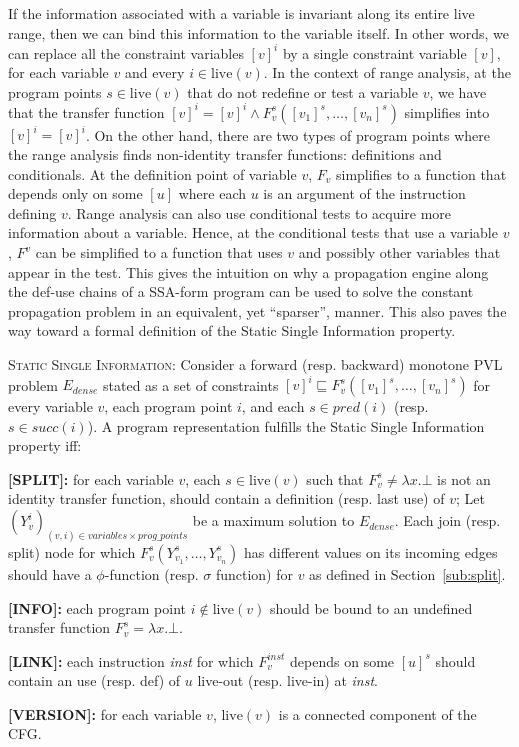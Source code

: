 If the information associated with a variable is invariant along its
entire live range, then we can bind this information to the variable itself.
In other words, we can replace all the constraint variables
$[v]^i$ by a single constraint variable $[v]$, for each variable $v$
and every $i\in \textrm{live}(v)$.
In the context of range analysis, at the program points $s\in \textrm{live}(v)$ that do not redefine or test a variable $v$, we have that the transfer function $[v]^i = [v]^i \wedge F_v^s([v_1]^s, \dots, [v_n]^s)$ simplifies into $[v]^i = [v]^i$.
On the other hand, there are two types of program points where the range analysis finds non-identity transfer functions: definitions and conditionals.
At the definition point of variable $v$, $F_v$ simplifies to a function that depends only on some $[u]$ where each $u$ is an argument of the instruction defining $v$.
Range analysis can also use conditional tests to acquire more information about a variable.
Hence, at the conditional tests that use a variable $v$, $F^v$ can be simplified to a function that uses $v$ and possibly other variables that appear in the test.
This gives the intuition on why a propagation engine along the def-use chains of a SSA-form program can be used to solve the constant propagation problem in an equivalent, yet ``sparser'', manner.
This also paves the way toward a formal definition of the Static Single Information property.

\begin{property}[SSI]
\label{pro:ssi}\textsc{Static Single Information:} Consider a forward (resp. backward) monotone PVL problem $E_{dense}$ stated as a set of constraints $[v]^i \sqsubseteq F_v^s([v_1]^s,\dots,[v_n]^s)$ for every variable $v$, each program point $i$, and each $s \in \mathit{pred}(i)$ (resp. $s\in \mathit{succ}(i)$).
A program representation fulfills the Static Single Information property iff:\begin{description}
\item {\bf [SPLIT]:} for each variable $v$, each $s\in \textrm{live}(v)$ such that $F_v^s\neq \lambda x.\bot$ is not an identity transfer function, should contain a definition (resp. last use) of $v$;
Let $(Y_v^i)_{(v,i)\in variables\times prog\_points}$ be a maximum solution to $
E_{dense}$.
Each join (resp. split) node for which $F_v^s(Y_{v_1}^s,\dots,Y_{v_n}^s)$ has different values on its incoming edges should have a $\phi$-function (resp. $\sigma$ function) for $v$ as defined in Section~\ref{sub:split}.
\item {\bf [INFO]:} each program point $i\not\in \textrm{live}(v)$ should be bound to an undefined transfer function $F_v^s=\lambda x.\bot$.
\item {\bf [LINK]:} each instruction {\em inst} for which $F_v^{inst}$ depends on some $[u]^s$ should contain an use (resp. def) of $u$ live-out (resp. live-in) at
{\em inst}.
\item {\bf [VERSION]:} for each variable $v$, $\textrm{live}(v)$ is a connected component of the CFG.
\end{description}
\end{property}


